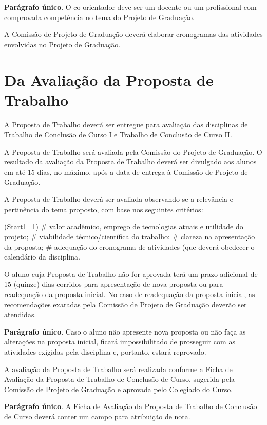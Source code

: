 \documentclass[12pt,geral,titlewithdate]{uftdocs}
\begin{document}
{\bf Parágrafo único}. O co-orientador deve ser um docente ou um profissional com comprovada competência no tema do Projeto de Graduação.

\artigo A Comissão de Projeto de Graduação deverá elaborar cronogramas das atividades envolvidas no Projeto de Graduação.

\chapter{Da Avaliação da Proposta de Trabalho}

\artigo A Proposta de Trabalho deverá ser entregue para avaliação das disciplinas de Trabalho de Conclusão de Curso I e Trabalho de Conclusão de Curso II.

\artigo A Proposta de Trabalho será avaliada pela Comissão do Projeto de Graduação. O resultado da avaliação da Proposta de Trabalho deverá ser divulgado aos alunos em até 15 dias, no máximo, após a data de entrega à Comissão de Projeto de Graduação.

\artigo\label{cri} A Proposta de Trabalho deverá ser avaliada observando-se a relevância e pertinência do tema proposto, com base nos seguintes critérios:

\begin{easylist}\ListProperties(Start1=1)
# valor acadêmico, emprego de tecnologias atuais e utilidade do projeto;
# viabilidade técnico/científica do trabalho;
# clareza na apresentação da proposta;
# adequação do cronograma de atividades (que deverá obedecer o calendário da disciplina.
\end{easylist}

\artigo O aluno cuja Proposta de Trabalho não for aprovada terá um prazo adicional de 15 (quinze) dias corridos para apresentação de nova proposta ou para readequação da proposta inicial. No caso de readequação da proposta inicial, as recomendações exaradas pela Comissão de Projeto de Graduação deverão ser atendidas.

{\bf Parágrafo único}. Caso o aluno não apresente nova proposta ou não faça as alterações na proposta inicial, ficará impossibilitado de prosseguir com as atividades exigidas pela disciplina e, portanto, estará reprovado.

\artigo A avaliação da Proposta de Trabalho será realizada conforme a Ficha de Avaliação da Proposta de Trabalho de Conclusão de Curso, sugerida pela Comissão de Projeto de Graduação e aprovada pelo Colegiado do Curso.


{\bf Parágrafo único}. A Ficha de Avaliação da Proposta de Trabalho de Conclusão de Curso deverá conter um campo para atribuição de nota.
\end{document}
